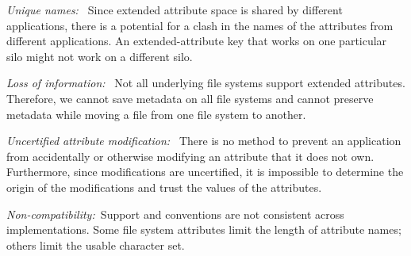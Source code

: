 \emph{Unique names:\ } Since extended attribute space is shared by different applications, there is a potential for a clash in the names of the attributes from different applications. An extended-attribute key that works on one particular silo might not work on a different silo.

\emph{Loss of information:\ } Not all underlying file systems support extended attributes. Therefore, we cannot save metadata on all file systems and cannot preserve metadata while moving a file from one file system to another.


\emph{Uncertified attribute modification:\ } There is no method to prevent an application from accidentally or otherwise modifying an attribute that it does not own. Furthermore, since modifications are uncertified, it is impossible to determine the origin of the modifications and trust the values of the attributes.

\emph{Non-compatibility:\ }Support and conventions are not consistent across implementations. Some file system attributes limit the length of attribute names; others limit the usable character set.


